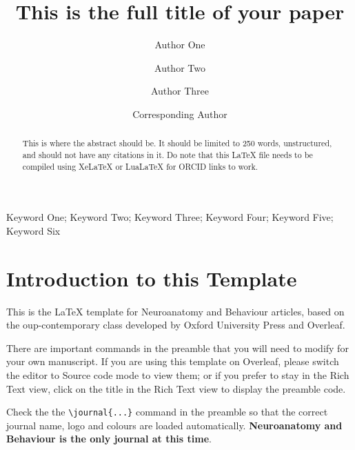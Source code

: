 \documentclass[a4paper,num-refs]{ehi-journals}
\title{This is the full title of your paper}
\author[1,\authfn{2}]{Author One\orcid{0000-0000-0000-0000}}
\author[1,2,\authfn{2}]{Author Two}
\author[1,2]{Author Three}
\author[1,\authfn{1}]{Corresponding Author}
\affil[1]{Affiliation 1\ror{example}}
\affil[2]{Affiliation 2\ror{example}}
\newcommand{\kwdone}{Keyword One}
\newcommand{\kwdtwo}{Keyword Two}
\newcommand{\kwdthree}{Keyword Three}
\newcommand{\kwdfour}{Keyword Four}
\newcommand{\kwdfive}{Keyword Five}
\newcommand{\kwdsix}{Keyword Six}
\begin{document}
\begin{frontmatter}
\maketitle
\begin{abstract}
This is where the abstract should be. It should be limited to 250 words, unstructured, and should not have any citations in it. Do note that this LaTeX file needs to be compiled using XeLaTeX or LuaLaTeX for ORCID links to work.
\end{abstract}

\begin{keywords}
\kwdone; \kwdtwo; \kwdthree; \kwdfour; \kwdfive; \kwdsix
\end{keywords}
\end{frontmatter}


\section{Introduction to this Template}


This is the \LaTeX{} template for Neuroanatomy and Behaviour articles, based on the oup-contemporary class developed by Oxford University Press and Overleaf. 

There are important commands in the preamble that you will need to modify for your own manuscript. If you are using this template on Overleaf, please switch the editor to Source code mode to view them; or if you prefer to stay in the Rich Text view, click on the title in the Rich Text view to display the preamble code.

Check the the \verb|\journal{...}| command in the preamble so that the correct journal name, logo and colours are loaded automatically. \textbf{Neuroanatomy and Behaviour is the only journal at this time}.
\end{document}
